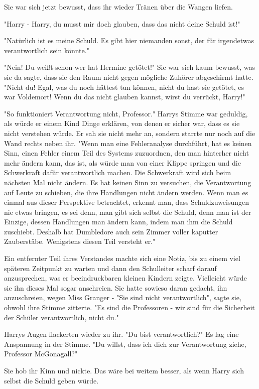 {Sie war sich jetzt bewusst, dass ihr wieder Tränen über die Wangen liefen.

"Harry - Harry, du musst mir doch glauben, dass das nicht deine Schuld ist!"

"Natürlich ist es meine Schuld. Es gibt hier niemanden sonst, der für irgendetwas verantwortlich sein könnte."

"Nein! Du-weißt-schon-wer hat Hermine getötet!" Sie war sich kaum bewusst, was sie da sagte, dass sie den Raum nicht gegen mögliche Zuhörer abgeschirmt hatte. "Nicht du! Egal, was du noch hättest tun können, nicht du hast sie getötet, es war Voldemort! Wenn du das nicht glauben kannst, wirst du verrückt, Harry!"

"So funktioniert Verantwortung nicht, Professor." Harrys Stimme war geduldig, als würde er einem Kind Dinge erklären, von denen er sicher war, dass es sie nicht verstehen würde. Er sah sie nicht mehr an, sondern starrte nur noch auf die Wand rechts neben ihr. "Wenn man eine Fehleranalyse durchführt, hat es keinen Sinn, einen Fehler einem Teil des Systems zuzuordnen, den man hinterher nicht mehr ändern kann, das ist, als würde man von einer Klippe springen und die Schwerkraft dafür verantwortlich machen. Die Schwerkraft wird sich beim nächsten Mal nicht ändern. Es hat keinen Sinn zu versuchen, die Verantwortung auf Leute zu schieben, die ihre Handlungen nicht ändern werden. Wenn man es einmal aus dieser Perspektive betrachtet, erkennt man, dass Schuldzuweisungen nie etwas bringen, es sei denn, man gibt sich selbst die Schuld, denn man ist der Einzige, dessen Handlungen man ändern kann, indem man ihm die Schuld zuschiebt. Deshalb hat Dumbledore auch sein Zimmer voller kaputter Zauberstäbe. Wenigstens diesen Teil versteht er."

Ein entfernter Teil ihres Verstandes machte sich eine Notiz, bis zu einem viel späteren Zeitpunkt zu warten und dann den Schulleiter scharf darauf anzusprechen, was er beeindruckbaren kleinen Kindern zeigte. Vielleicht würde sie ihn dieses Mal sogar anschreien. Sie hatte sowieso daran gedacht, ihn anzuschreien, wegen Miss Granger - "Sie sind nicht verantwortlich", sagte sie, obwohl ihre Stimme zitterte. "Es sind die Professoren - wir sind für die Sicherheit der Schüler verantwortlich, nicht du."

Harrys Augen flackerten wieder zu ihr. "Du bist verantwortlich?" Es lag eine Anspannung in der Stimme. "Du willst, dass ich dich zur Verantwortung ziehe, Professor McGonagall?"

Sie hob ihr Kinn und nickte. Das wäre bei weitem besser, als wenn Harry sich selbst die Schuld geben würde.

}
